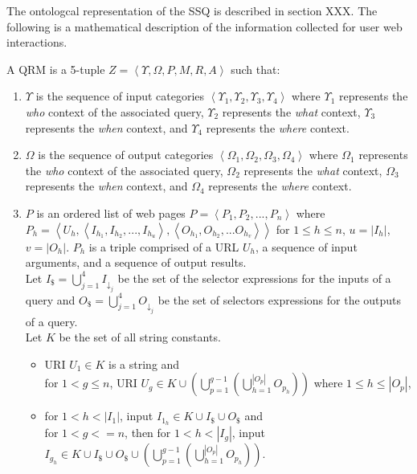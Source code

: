 The ontologcal representation of the SSQ is described in section {{XXX}}.  The following is a mathematical description of the information collected for user web interactions.

A QRM is a 5-tuple $Z = \left< \Upsilon, \Omega, P, M, R, A \right>$ such that:

\begin{enumerate}
\item $\Upsilon$ is the sequence of input categories $\left<
  \Upsilon_{1}, \Upsilon_{2}, \Upsilon_{3}, \Upsilon_{4} \right>$
  where $\Upsilon_{1}$ represents the \emph{who} context of the
  associated query, $\Upsilon_{2}$ represents the \emph{what} context,
  $\Upsilon_{3}$ represents the \emph{when} context, and
  $\Upsilon_{4}$ represents the \emph{where} context.

\item $\Omega$ is the sequence of output categories $\left<\Omega_{1},
  \Omega_{2}, \Omega_{3}, \Omega_{4}\right>$ where $\Omega_{1}$
  represents the \emph{who} context of the associated query,
  $\Omega_{2}$ represents the \emph{what} context, $\Omega_{3}$
  represents the \emph{when} context, and $\Omega_{4}$ represents the
  \emph{where} context.

\item $P$ is an ordered list of web pages $P = \left<P_1,P_2,...,
  P_n\right>$ where $P_h =
  \left<U_h,\left<I_{h_1},I_{h_2},...,I_{h_u}\right>,\left<O_{h_1},O_{h_2},...O_{h_v}\right>\right>$
  for $1 \leq h \leq n$, $u = \left| I_h \right|$, $v = \left| O_h
  \right|$. $P_h$ is a triple comprised of a URL $U_h$, a sequence of
  input arguments, and a sequence of output results.  \\ Let $I_{\$} =
  \bigcup_{j=1}^{4} I_{\downarrow_j}$ be the set of the selector
  expressions for the inputs of a query and $O_{\$} =
  \bigcup_{j=1}^{4} O_{\downarrow_j}$ be the set of selectors
  expressions for the outputs of a query.  \\ Let $K$ be the set of
  all string constants.
\begin{itemize}
\item URI $U_1 \in K$ is a string and \\ for $1 < g \leq n$, URI $U_g
  \in K \cup \left( \bigcup^{g-1}_{p=1} \left(
  \bigcup^{\left|O_p\right|}_{h=1}O_{p_h} \right)\right)$ where $1
  \leq h \leq \left| O_p \right| $,

\item for $1 < h < \left| I_1 \right|$, input $I_{1_h} \in K \cup
  I_{\$} \cup O_{\$}$ and \\ for $1 < g <= n$, then for $1 < h <
  \left| I_g \right|$, input $I_{g_h} \in K \cup I_{\$} \cup O_{\$}
  \cup \left( \bigcup^{g-1}_{p=1} \left(
  \bigcup^{\left|O_p\right|}_{h=1}O_{p_h} \right)\right)$.
\end{itemize}


\end{enumerate}
